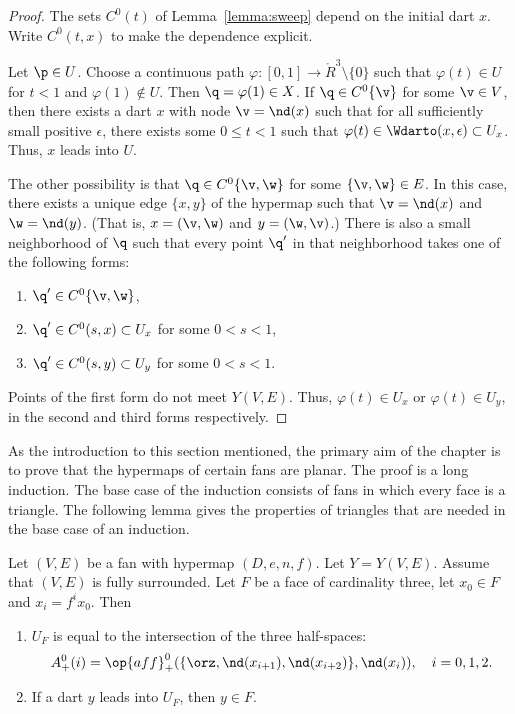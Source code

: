 \begin{proof}  
The sets $C^0(t)$ of Lemma~\ref{lemma:sweep} depend on the initial dart $x$.
Write $C^0(t,x)$ to make the dependence explicit.

Let $\p\in U$.  Choose a continuous path $\varphi:[0,1]\to
\ring{R}^3\setminus\{0\}$ such that $\varphi(t)\in U$ for $t<1$ and
$\varphi(1)\not\in U$.  Then $\q=\varphi(1)\in X$.  If $\q\in
C^0\{\v\}$ for some $\v\in V$, then there exists a dart $x$ with
node $\v = \nd(x)$ such that for all sufficiently small positive
$\epsilon$, there exists some $0\le t < 1$ such that $\varphi(t)\in
\Wdarto(x,\epsilon)\subset U_x$.  Thus, $x$ leads into $U$.
%

The other possibility is that $\q\in C^0\{\v,\w\}$ for some
$\{\v,\w\}\in E$.  In this case, there exists a unique edge $\{x,y\}$ of
the hypermap such that $\v=\nd(x)$ and $\w=\nd(y)$.  (That is,
$x=(\v,\w)$ and $y=(\w,\v)$.)  There is also a small neighborhood of
$\q$ such that every point $\q'$ in that neighborhood takes one of
the following forms:
\begin{enumerate}\wasitemize  \item $\q'\in C^0\{\v,\w\}$,
\item $\q'\in C^0(s,x)\subset U_x$ for some $0<s<1$,
\item $\q'\in C^0(s,y)\subset U_y$ for some $0<s<1$.
\end{enumerate}\wasitemize 
Points of the first form do not meet $Y(V,E)$.  Thus, $\varphi(t)\in U_x$
or $\varphi(t)\in U_y$, in the second and third forms respectively.
\end{proof}

As the introduction to this section mentioned, the primary aim of the chapter
is to prove that the hypermaps of certain fans are planar.  The proof is a long
induction.  The base case of the induction consists of fans in which every face
is a triangle.  The following lemma gives the properties of triangles that are
needed in the base case of an induction.

\begin{lemma} \label{lemma:triangle}
Let $(V,E)$ be a fan with hypermap $(D,e,n,f)$.  Let $Y=Y(V,E)$.
Assume that $(V,E)$ is fully surrounded. Let  $F$ be a face of
cardinality three, let $x_0\in F$ and  $x_i = f^i x_0$. Then
%
\begin{enumerate}\wasitemize   
\item $U_F$ is equal to the intersection of the three half-spaces:
\[ A^0_+(i)=\op{aff}_+^0(\{\orz,\nd(x_{i+1}),\nd(x_{i+2})\},\nd(x_i)),\quad
i=0,1,2.\] 
\item If a dart $y$ leads into $U_F$, then $y\in F$.
\end{enumerate}\wasitemize 
\end{lemma}
%

